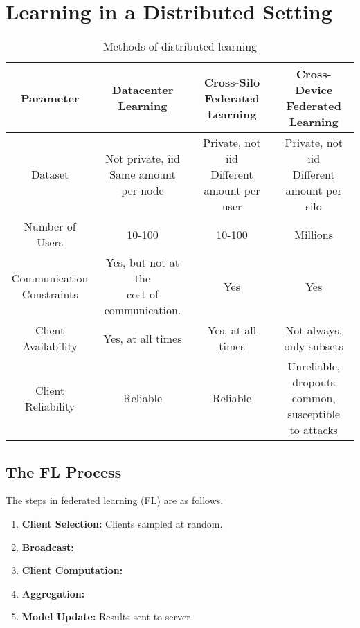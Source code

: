 \documentclass[twoside]{article}
\begin{document}
\section{Learning in a Distributed Setting}

\begin{table}[!ht]
    \centering
    \begin{tabular}{|c|c|c|c|}
        \hline
        \textbf{Parameter} & \textbf{Datacenter Learning} & \makecell{\textbf{Cross-Silo}\\\textbf{Federated Learning}} & \makecell{\textbf{Cross-Device}\\\textbf{Federated Learning}} \\
        \hline
        Dataset & \makecell{Not private, iid\\Same amount per node} & \makecell{Private, not iid\\Different amount per user} & \makecell{Private, not iid\\Different amount per silo} \\
        \hline
        Number of Users & 10-100 & 10-100 & Millions \\
        \hline
        \makecell{Communication\\Constraints} & \makecell{Yes, but not at the\\cost of communication.} & Yes & Yes \\
        \hline
        \makecell{Client\\Availability} & Yes, at all times & Yes, at all times & Not always, only subsets \\
        \hline
        \makecell{Client\\Reliability} & Reliable & Reliable & \makecell{Unreliable, dropouts\\common, susceptible\\to attacks} \\
        \hline
    \end{tabular}
    \caption{Methods of distributed learning}
    \label{tab:methods-dist}
\end{table}

\subsection{The FL Process}

The steps in federated learning (FL) are as follows.

\begin{enumerate}
    \item \textbf{Client Selection:} Clients sampled at random.
    \item \textbf{Broadcast:} 
    \item \textbf{Client Computation:}
    \item \textbf{Aggregation:}
    \item \textbf{Model Update:} Results sent to server
\end{enumerate}
\end{document}
